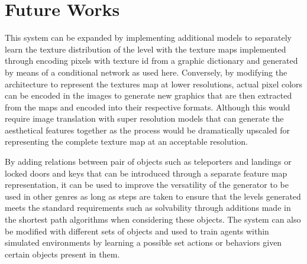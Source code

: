 \documentclass{Configuration_Files/PoliMi3i_thesis}
\begin{document}
\section{Future Works}
This system can be expanded by implementing additional models to separately learn 
the texture distribution of the level with the texture maps implemented through 
encoding pixels with texture id from a graphic dictionary and generated by 
means of a conditional network as used here. Conversely, by modifying the 
architecture to represent the textures map at lower resolutions, actual pixel colors can 
be encoded in the images to generate new graphics that are then extracted from the 
maps and encoded into their respective formats. Although this would  require image 
translation with super resolution models \cite{XuW22} that can generate the aesthetical features
together as the process would be dramatically upscaled for representing the
complete texture map at an acceptable resolution. 

By adding relations between pair of objects such as teleporters and landings or 
locked doors and keys that can be introduced through a separate feature map
representation, it can be used to improve the versatility of the generator to be used in
other genres as long as steps are taken to ensure that the levels generated meets the 
standard requirements such as solvability through additions made in the shortest 
path algorithms when considering these objects. The system can also be modified
with different sets of objects and used to train agents within simulated environments 
by learning a possible set actions or behaviors given certain objects present in them.





\cleardoublepage
{} %
\appendix
\end{document}
